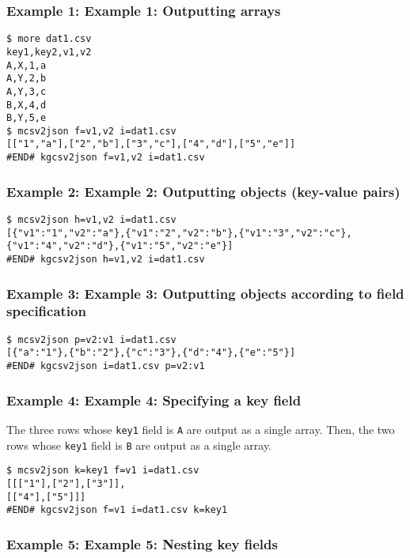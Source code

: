 \subsubsection*{Example 1: Example 1: Outputting arrays}



\begin{Verbatim}[baselinestretch=0.7,frame=single]
$ more dat1.csv
key1,key2,v1,v2
A,X,1,a
A,Y,2,b
A,Y,3,c
B,X,4,d
B,Y,5,e
$ mcsv2json f=v1,v2 i=dat1.csv
[["1","a"],["2","b"],["3","c"],["4","d"],["5","e"]]
#END# kgcsv2json f=v1,v2 i=dat1.csv
\end{Verbatim}
\subsubsection*{Example 2: Example 2: Outputting objects (key-value pairs)}



\begin{Verbatim}[baselinestretch=0.7,frame=single]
$ mcsv2json h=v1,v2 i=dat1.csv
[{"v1":"1","v2":"a"},{"v1":"2","v2":"b"},{"v1":"3","v2":"c"},{"v1":"4","v2":"d"},{"v1":"5","v2":"e"}]
#END# kgcsv2json h=v1,v2 i=dat1.csv
\end{Verbatim}
\subsubsection*{Example 3: Example 3: Outputting objects according to field specification}



\begin{Verbatim}[baselinestretch=0.7,frame=single]
$ mcsv2json p=v2:v1 i=dat1.csv
[{"a":"1"},{"b":"2"},{"c":"3"},{"d":"4"},{"e":"5"}]
#END# kgcsv2json i=dat1.csv p=v2:v1
\end{Verbatim}
\subsubsection*{Example 4: Example 4: Specifying a key field}

The three rows whose \verb|key1| field is \verb|A| are output as a single array. Then, the two rows whose \verb|key1| field is \verb|B| are output as a single array.


\begin{Verbatim}[baselinestretch=0.7,frame=single]
$ mcsv2json k=key1 f=v1 i=dat1.csv
[[["1"],["2"],["3"]],
[["4"],["5"]]]
#END# kgcsv2json f=v1 i=dat1.csv k=key1
\end{Verbatim}
\subsubsection*{Example 5: Example 5: Nesting key fields}

